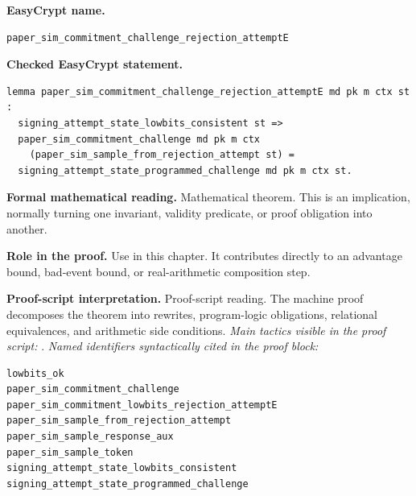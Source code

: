 \begin{formaltheorem}
\noindent\textbf{EasyCrypt name.}
\begin{lstlisting}[language=EasyCrypt,basicstyle=\ttfamily\scriptsize]
paper_sim_commitment_challenge_rejection_attemptE
\end{lstlisting}
\noindent\textbf{Checked EasyCrypt statement.}
\begin{lstlisting}[language=EasyCrypt,basicstyle=\ttfamily\scriptsize]
lemma paper_sim_commitment_challenge_rejection_attemptE md pk m ctx st :
  signing_attempt_state_lowbits_consistent st =>
  paper_sim_commitment_challenge md pk m ctx
    (paper_sim_sample_from_rejection_attempt st) =
  signing_attempt_state_programmed_challenge md pk m ctx st.
\end{lstlisting}
\noindent\textbf{Formal mathematical reading.}
Mathematical theorem. This is an implication, normally turning one invariant, validity predicate, or proof obligation into another.

\noindent\textbf{Role in the proof.}
Use in this chapter. It contributes directly to an advantage bound, bad-event bound, or real-arithmetic composition step.

\noindent\textbf{Proof-script interpretation.}
Proof-script reading. The machine proof decomposes the theorem into rewrites, program-logic obligations, relational equivalences, and arithmetic side conditions.
\emph{Main tactics visible in the proof script:} .
\emph{Named identifiers syntactically cited in the proof block:}
\begin{lstlisting}[language=EasyCrypt,basicstyle=\ttfamily\scriptsize]
lowbits_ok
paper_sim_commitment_challenge
paper_sim_commitment_lowbits_rejection_attemptE
paper_sim_sample_from_rejection_attempt
paper_sim_sample_response_aux
paper_sim_sample_token
signing_attempt_state_lowbits_consistent
signing_attempt_state_programmed_challenge
\end{lstlisting}

\end{formaltheorem}

